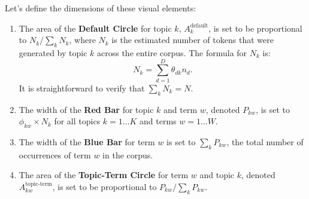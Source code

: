\documentclass[12pt]{article}
\begin{document}
Let's define the dimensions of these visual elements:
\begin{enumerate}
\item The area of the \textbf{Default Circle} for topic $k$, $A^\text{default}_k$, is set to be proportional to $N_k/\sum_k N_k$, where $N_k$ is the estimated number of tokens that were generated by topic $k$ across the entire corpus. The formula for $N_k$ is:
$$
N_k = \sum_{d=1}^D \theta_{dk}n_d.
$$
It is straightforward to verify that $\sum_k N_k = N$.
\item The width of the \textbf{Red Bar} for topic $k$ and term $w$, denoted $P_{kw}$, is set to $\phi_{kw} \times N_k$ for all topics $k = 1...K$ and terms $w = 1...W$.
\item The width of the \textbf{Blue Bar} for term $w$ is set to $\sum_k P_{kw}$, the total number of occurrences of term $w$ in the corpus.
\item The area of the \textbf{Topic-Term Circle} for term $w$ and topic $k$, denoted $A^\text{topic-term}_{kw}$, is set to be proportional to $P_{kw}/\sum_k P_{kw}$.
\end{enumerate}
\end{document}
